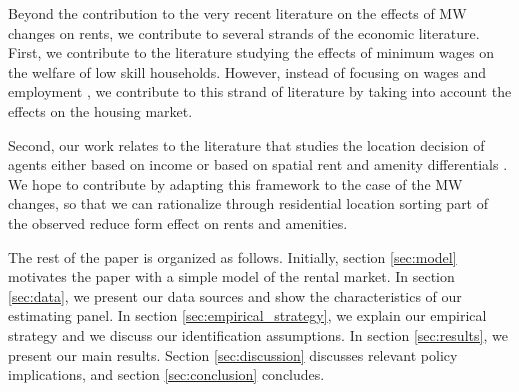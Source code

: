 
Beyond the contribution to the very recent literature on the effects of MW changes on rents, we 
contribute to several strands of the economic literature. First, we contribute to the literature 
studying the effects of minimum wages on the welfare of low skill households. However, instead of 
focusing on wages and employment \parencite[][among others]{dinardo1995labor, autor2016contribution, 
card2000minimum, neumark2006minimum, jardim2017minimum}, we contribute to this strand of literature 
by taking into account the effects on the housing market.

Second, our work relates to the literature that studies the location decision of agents either based 
on income \parencite{roback1982wages, kennan2011effect, desmet2013urban, perez2018city} or based on 
spatial rent and amenity differentials \parencite{diamond2016determinants, almagro2019location, 
couture2019income, bayer2004equilibrium}. We hope to contribute by adapting this framework to the 
case of the MW changes, so that we can rationalize through residential location sorting part of 
the observed reduce form effect on rents and amenities.

The rest of the paper is organized as follows. Initially, section \ref{sec:model} motivates the paper
with a simple model of the rental market. In section \ref{sec:data}, we present our data sources and 
show the characteristics of our estimating panel. In section \ref{sec:empirical_strategy}, we explain 
our empirical strategy and we discuss our identification assumptions. In section \ref{sec:results}, we 
present our main results. Section \ref{sec:discussion} discusses relevant policy implications, and 
section \ref{sec:conclusion} concludes.
